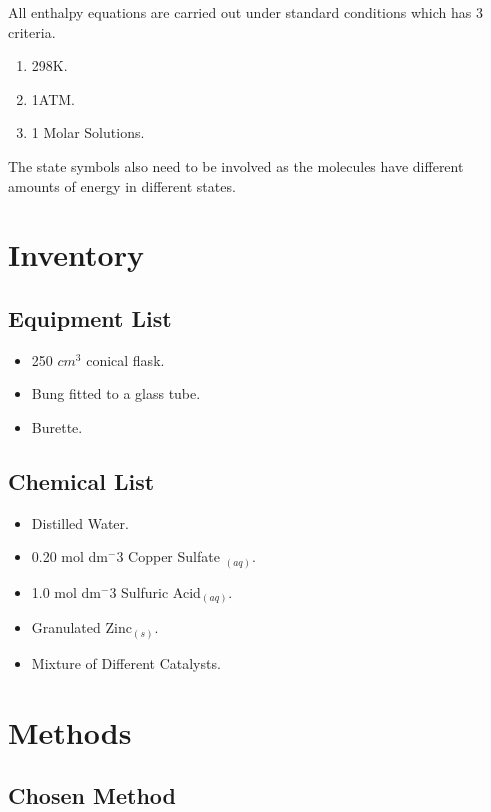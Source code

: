 All enthalpy equations are carried out under standard conditions which has 3 criteria.

\begin{enumerate}
\item 298K.
\item 1ATM.
\item 1 Molar Solutions.
\end{enumerate}

The state symbols also need to be involved as the molecules have different amounts of energy in different states.



\section{Inventory}

	\subsection{Equipment List}
\begin{itemize}
\item 250 $cm^3$ conical flask.
\item Bung fitted to a glass tube.
\item Burette.
\end{itemize}

	\subsection{Chemical List}
\begin{itemize}
\item Distilled Water.
\item 0.20 mol dm$^-3$ Copper Sulfate ${_(aq)}$.
\item 1.0 mol dm$^-3$ Sulfuric Acid${_(aq)}$.
\item Granulated Zinc${_(s)}$.
\item Mixture of Different Catalysts.
\end{itemize}



\section{Methods}

	\subsection{Chosen Method}

